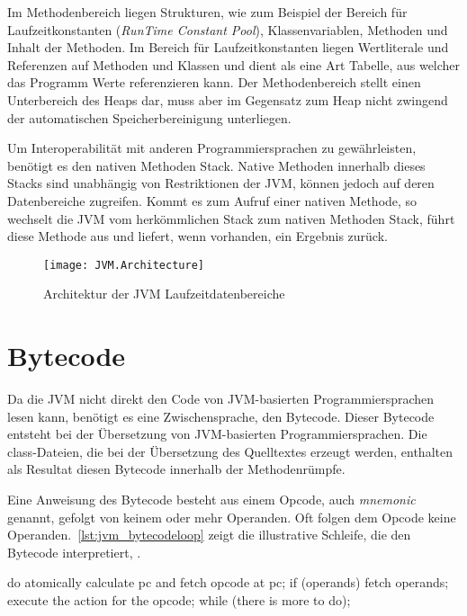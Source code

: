 Im Methodenbereich liegen Strukturen, wie zum Beispiel der Bereich für Laufzeitkonstanten (\textit{Run\-Time Constant Pool}), Klassenvariablen, Methoden und Inhalt der Methoden. Im Bereich für Laufzeitkonstanten liegen Wertliterale und Referenzen auf Methoden und Klassen und dient als eine Art Tabelle, aus welcher das Programm Werte referenzieren kann.  Der Methodenbereich stellt einen Unterbereich des Heaps dar, muss aber im Gegensatz zum Heap nicht zwingend der automatischen Speicherbereinigung unterliegen.

Um Interoperabilität mit anderen Programmiersprachen zu gewährleisten, benötigt es den nativen Methoden Stack. Native Methoden innerhalb dieses Stacks sind unabhängig von Restriktionen der JVM, können jedoch auf deren Datenbereiche zugreifen. Kommt es zum Aufruf einer nativen Methode, so wechselt die JVM vom herkömmlichen Stack zum nativen Methoden Stack, führt diese Methode aus und liefert, wenn vorhanden, ein Ergebnis zurück.

\begin{figure}
    \caption{Architektur der JVM Laufzeitdatenbereiche}
    \centering
    \texttt{[image: JVM.Architecture]}
    \label{fig:jvm-architecture}
\end{figure}

\section{Bytecode}

Da die JVM nicht direkt den Code von JVM-basierten Programmiersprachen lesen kann, benötigt es eine Zwischensprache, den Bytecode. Dieser Bytecode entsteht bei der Übersetzung von JVM-basierten Programmiersprachen. Die class-Dateien, die bei der Übersetzung des Quelltextes erzeugt werden, enthalten als Resultat diesen Bytecode innerhalb der Methodenrümpfe.

Eine Anweisung des Bytecode besteht aus einem Opcode, auch \textit{mnemonic} genannt, gefolgt von keinem oder mehr Operanden. Oft folgen dem Opcode keine Operanden.~\autoref{lst:jvm_bytecodeloop} zeigt die illustrative Schleife, die den Bytecode interpretiert, \cite[siehe S. 25]{lindholm2016java}.

\begin{JavaCode}[numbers=none, caption={Auszug aus der JVM Spezifikation, welche die Interpretationsschleife für Bytecode repräsentiert.}, label=lst:jvm_bytecodeloop]
do {
    atomically calculate pc and fetch opcode at pc;
    if (operands) fetch operands;
    execute the action for the opcode;
} while (there is more to do);
\end{JavaCode}

